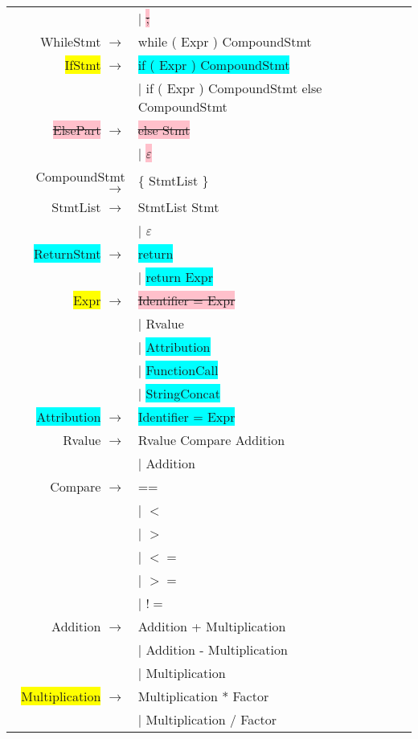 \documentclass[12pt]{article}
\begin{document}
\begin{longtable}{ r l }
								& $|$ \colorbox{pink}{\sout{;}} \\
	WhileStmt		$\rightarrow$ 	& while ( Expr ) CompoundStmt \\
	\colorbox{yellow}{IfStmt}			$\rightarrow$ 	& \colorbox{cyan}{if ( Expr ) CompoundStmt} \\
									& $|$ if ( Expr ) CompoundStmt else CompoundStmt \\
	\colorbox{pink}{\sout{ElsePart}}		$\rightarrow$ 	& \colorbox{pink}{\sout{else Stmt}} \\
								& $|$ \colorbox{pink}{\sout{$\varepsilon$}} \\
	CompoundStmt	$\rightarrow$ 	& \{ StmtList \} \\
	StmtList		$\rightarrow$ 	& StmtList Stmt \\
									& $|$ $\varepsilon$ \\
	\colorbox{cyan}{ReturnStmt}		$\rightarrow$ 	& \colorbox{cyan}{return} \\
									& $|$ \colorbox{cyan}{return Expr} \\
	\colorbox{yellow}{Expr}			$\rightarrow$ 	& \colorbox{pink}{\sout{Identifier = Expr}} \\
									& $|$ Rvalue \\
									& $|$ \colorbox{cyan}{Attribution} \\
									& $|$ \colorbox{cyan}{FunctionCall} \\
									& $|$ \colorbox{cyan}{StringConcat} \\
	\colorbox{cyan}{Attribution}		$\rightarrow$ 	& \colorbox{cyan}{Identifier = Expr} \\
	Rvalue			$\rightarrow$ 	& Rvalue Compare Addition \\
									& $|$ Addition \\
	Compare			$\rightarrow$ 	& ==  \\
									& $|$ $<$ \\
									& $|$ $>$ \\
									& $|$ $<=$ \\
									& $|$ $>=$ \\
									& $|$ $!=$ \\
	Addition		$\rightarrow$ 	& Addition + Multiplication \\
									& $|$ Addition - Multiplication \\
									& $|$ Multiplication \\
	\colorbox{yellow}{Multiplication}	$\rightarrow$ 	& Multiplication * Factor \\
									& $|$ Multiplication / Factor \\

\end{longtable}
\end{document}
